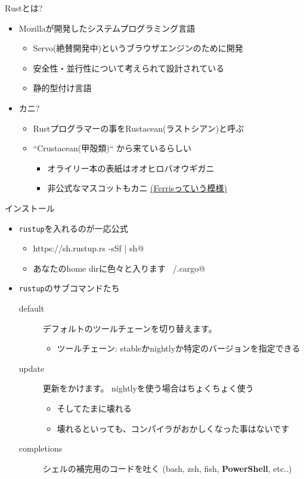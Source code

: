\documentclass[cjk,dvipdfmx,10pt,compress,fragile%
hyperref={bookmarks=true,bookmarksnumbered=true,bookmarksopen=false,%
colorlinks=false,%
pdftitle={第 134 回 関西 Debian 勉強会},%
pdfauthor={小林},%
pdfsubject={資料},%
}]{beamer}
\begin{document}
\begin{frame}[t,fragile]{Rustとは?}
 \begin{itemize}
  \item Mozillaが開発したシステムプログラミング言語
	\begin{itemize}
	 \item Servo(絶賛開発中)というブラウザエンジンのために開発
	 \item 安全性・並行性について考えられて設計されている
	 \item 静的型付け言語
	\end{itemize}
  \item カニ?
	\begin{itemize}
	 \item Rustプログラマーの事をRustacean(ラストシアン)と呼ぶ
	 \item ``Crustacean(甲殻類)`` から来ているらしい
	       \begin{itemize}
		\item オライリー本の表紙はオオヒロバオウギガニ
		\item 非公式なマスコットもカニ \href{http://rustacean.net/}{(Ferrisっていう模様)}
	       \end{itemize}
	\end{itemize}
 \end{itemize}
\end{frame}

\begin{frame}[t,fragile]{インストール}
 \begin{itemize}
  \item \texttt{rustup}を入れるのが一応公式
	\begin{itemize}
	 \item \verb@curl https://sh.rustup.rs -sSf | sh@
	 \item あなたのhome dirに色々と入ります \verb@~/.cargo@
	\end{itemize}
  \item \texttt{rustup}のサブコマンドたち
	\begin{description}
	 \item[default] デフォルトのツールチェーンを切り替えます。
		    \begin{itemize}
		     \item ツールチェーン: stableかnightlyか特定のバージョンを指定できる
		    \end{itemize}
	 \item[update] 更新をかけます。
		    nightlyを使う場合はちょくちょく使う
		    \begin{itemize}
		     \item そしてたまに壊れる
		     \item 壊れるといっても、コンパイラがおかしくなった事はないです
		    \end{itemize}
	 \item[completions] シェルの補完用のコードを吐く (bash, zsh, fish, \textbf{PowerShell}, etc..)
	\end{description}
 \end{itemize}
\end{frame}
\end{document}
